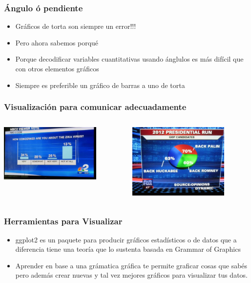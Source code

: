 \documentclass[9pt, spanish]{beamer}\usepackage[]{graphicx}\usepackage[]{color}
\begin{document}
\begin{frame}
\frametitle{\'Angulo \'o pendiente}
\begin{itemize}
\item Gr\'aficos de torta son siempre un error!!!

\item Pero ahora sabemos porqu\'e

\item Porque decodificar variables cuantitativas usando \'anglulos es m\'as dif\'icil que con otros elementos gr\'aficos 

\item Siempre es preferible un gr\'afico de barras a uno de torta

\end{itemize}
\end{frame}

\begin{frame}
\frametitle{Visualizaci\'on para comunicar adecuadamente}

\begin{columns}
\begin{column}{6cm}
\includegraphics[width=5cm]{ej1}
\end{column}

\begin{column}{6cm}
\includegraphics[width=5cm]{ej2}
\end{column}
\end{columns}
\end{frame}

\begin{frame}
\frametitle{Herramientas para Visualizar}
\begin{itemize}
\item ggplot2 \citep{wickham2016ggplot2} es un paquete para producir gráficos estadísticos o de datos que a diferencia tiene una teoría que lo sustenta basada en Grammar of Graphics \citep{wilkinson2006grammar}


\item Aprender en base a una grámatica gráfica te permite graficar cosas que sabés pero además crear nuevas y tal vez mejores gráficos para visualizar tus datos.
\end{itemize}
\end{frame}
\end{document}
